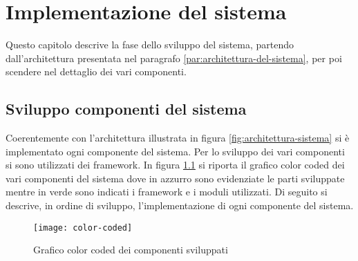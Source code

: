 
\chapter{Implementazione del sistema}
\label{cap:implementazione}

Questo capitolo descrive la fase dello sviluppo del sistema, partendo dall'architettura presentata nel paragrafo \ref{par:architettura-del-sistema}, per poi scendere nel dettaglio dei vari componenti.

\section{Sviluppo componenti del sistema}
Coerentemente con l'architettura illustrata in figura \ref{fig:architettura-sistema} si è implementato ogni componente del sistema. Per lo sviluppo dei vari componenti si sono utilizzati dei framework. In figura \ref{fig:color-coded} si riporta il grafico color coded dei vari componenti del sistema dove in azzurro sono evidenziate le parti sviluppate mentre in verde sono indicati i framework e i moduli utilizzati. Di seguito si descrive, in ordine di sviluppo, l’implementazione di ogni componente del sistema.

\begin{figure}[htp]
	\centering
	\texttt{[image: color-coded]}
	\caption{Grafico color coded dei componenti sviluppati}
	\label{fig:color-coded}
\end{figure}

